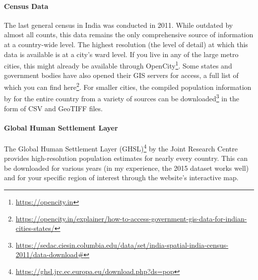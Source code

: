\documentclass[
]{latex/krantz}
\renewcommand{\href}[2]{#2\footnote{\url{#1}}}
\DeclareRobustCommand{\href}[2]{#2\footnote{\url{#1}}}
\begin{document}
\hypertarget{census-data}{%
\paragraph*{Census Data}\label{census-data}}

The last general census in India was conducted in 2011. While outdated by almost all counts, this data remains the only comprehensive source of information at a country-wide level. The highest resolution (the level of detail) at which this data is available is at a city's ward level. If you live in any of the large metro cities, this might already be available through \href{https://opencity.in}{OpenCity}. Some states and government bodies have also opened their GIS servers for access, a full list of which you can find \href{https://opencity.in/explainer/how-to-access-government-gis-data-for-indian-cities-states/}{here}. For smaller cities, the compiled population information by \autocite{balkSpatialData20112020} for the entire country from a variety of sources can be \href{https://sedac.ciesin.columbia.edu/data/set/india-spatial-india-census-2011/data-download\#}{downloaded} in the form of CSV and GeoTIFF files.

\hypertarget{global-human-settlement-layer}{%
\paragraph*{Global Human Settlement Layer}\label{global-human-settlement-layer}}

The \href{https://ghsl.jrc.ec.europa.eu/download.php?ds=pop}{Global Human Settlement Layer (GHSL)} by the Joint Research Centre provides high-resolution population estimates for nearly every country. This can be downloaded for various years (in my experience, the 2015 dataset works well) and for your specific region of interest through the website's interactive map.

\end{document}
